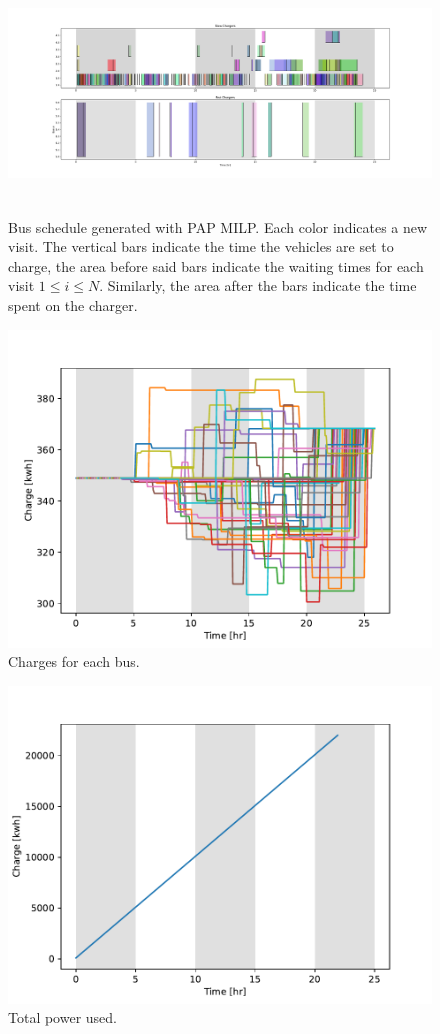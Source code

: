 \documentclass[letterpaper, 10pt, conference]{IEEEtran}
\begin{document}
\begin{figure}[h]
	\centering
	\includegraphics[trim=3in 0in 3in 0in, width=\linewidth, height=2.5in]{schedule.pdf}
	\caption{Bus schedule generated with PAP MILP. Each color indicates a new visit. The vertical bars indicate the time the vehicles are set to charge, the area before said bars indicate the waiting times for each visit \(1 \leq i \leq N\). Similarly, the area after the bars indicate the time spent on the charger.}
	\label{fig:charges}
\end{figure}

\begin{figure}[h]
	\centering
	\includegraphics[width=0.75\linewidth]{charges.pdf}
	\caption{Charges for each bus.}
	\label{fig:schedule}
\end{figure}


\begin{figure}[h]
	\centering
	\includegraphics[width=0.75\linewidth]{usage.pdf}
	\caption{Total power used.}
	\label{fig:usage}
\end{figure}
\end{document}
